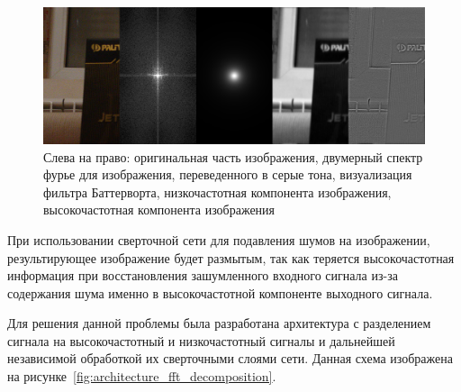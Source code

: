 \begin{figure}[h]
	\centering
	\includegraphics[width=\textwidth]{img/fft_comparison}
	\caption{Слева на право: оригинальная часть изображения, двумерный спектр фурье для изображения, переведенного в серые тона, визуализация фильтра Баттерворта, низкочастотная компонента изображения, высокочастотная компонента изображения}
	\label{fig:fft_comparison}
\end{figure}

При использовании сверточной сети для подавления шумов на изображении, результирующее изображение будет размытым, так как теряется высокочастотная информация при восстановления зашумленного входного сигнала из-за содержания шума именно в высокочастотной компоненте выходного сигнала.

Для решения данной проблемы была разработана архитектура с разделением сигнала на высокочастотный и низкочастотный сигналы и дальнейшей независимой обработкой их сверточными слоями сети. Данная схема изображена на рисунке~\ref{fig:architecture_fft_decomposition}.

